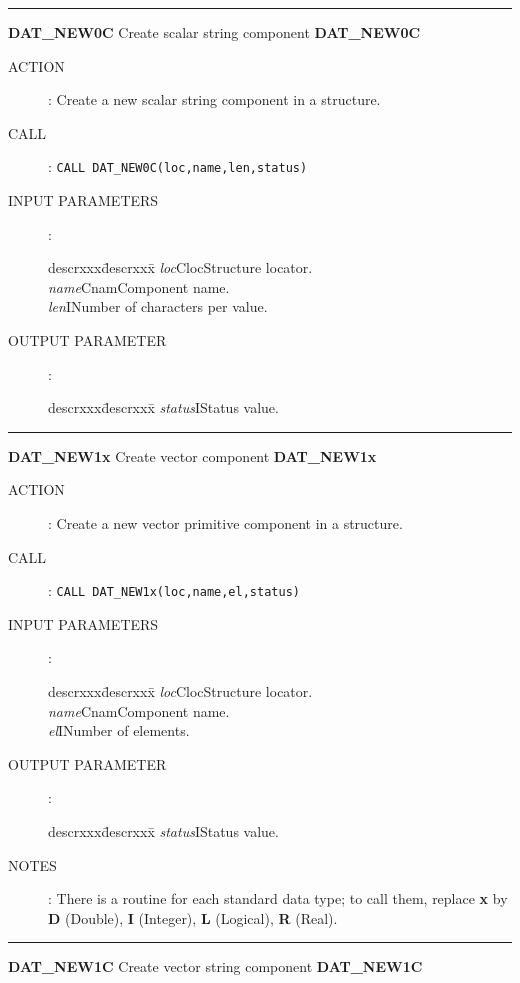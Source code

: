 \goodbreak
\rule{\textwidth}{0.3mm}
{\Large {\bf DAT\_NEW0C} \hfill Create scalar string component \hfill {\bf DAT\_NEW0C}}
\begin{description}
\item [ACTION]:
Create a new scalar string component in a structure.
\item [CALL]:
{\tt CALL DAT\_NEW0C(loc,name,len,status)}
\item [INPUT PARAMETERS]:
\begin{tabbing}
descrxxx\=descrxxx\=\kill
{\em loc}\>Cloc\>Structure locator.\\
{\em name}\>Cnam\>Component name.\\
{\em len}\>I\>Number of characters per value.
\end{tabbing}
\item [OUTPUT PARAMETER]:
\begin{tabbing}
descrxxx\=descrxxx\=\kill
{\em status}\>I\>Status value.
\end{tabbing}
\end{description}
\goodbreak
\rule{\textwidth}{0.3mm}
{\Large {\bf DAT\_NEW1x} \hfill Create vector component \hfill {\bf DAT\_NEW1x}}
\begin{description}
\item [ACTION]:
Create a new vector primitive component in a structure.
\item [CALL]:
{\tt CALL DAT\_NEW1x(loc,name,el,status)}
\item [INPUT PARAMETERS]:
\begin{tabbing}
descrxxx\=descrxxx\=\kill
{\em loc}\>Cloc\>Structure locator.\\
{\em name}\>Cnam\>Component name.\\
{\em el}\>I\>Number of elements.
\end{tabbing}
\item [OUTPUT PARAMETER]:
\begin{tabbing}
descrxxx\=descrxxx\=\kill
{\em status}\>I\>Status value.
\end{tabbing}
\item [NOTES]:
There is a routine for each standard data type; to call them, replace {\bf x}
by {\bf D} (Double), {\bf I} (Integer), {\bf L} (Logical), {\bf R} (Real).
\end{description}
\goodbreak
\rule{\textwidth}{0.3mm}
{\Large {\bf DAT\_NEW1C} \hfill Create vector string component \hfill {\bf DAT\_NEW1C}}
